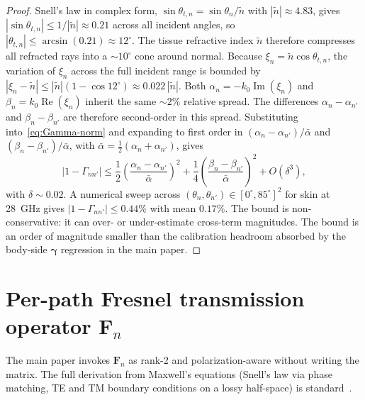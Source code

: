 \documentclass[10pt,journal,twocolumn]{IEEEtran}
\newcommand{\Fn}{\mathbf{F}_n}
\newcommand{\gammab}{\bm{\gamma}}
\newcommand{\ntilde}{\tilde{n}}
\DeclareMathOperator{\RE}{Re}
\DeclareMathOperator{\IM}{Im}
\theoremstyle{plain}
\theoremstyle{definition}
\begin{document}
\begin{proof}
Snell's law in complex form, $\sin\theta_{t,n} = \sin\theta_n/\ntilde$
with $|\ntilde| \approx 4.83$, gives
$|\sin\theta_{t,n}| \leq 1/|\ntilde| \approx 0.21$ across all
incident angles, so $|\theta_{t,n}| \leq \arcsin(0.21) \approx
12^{\circ}$. The tissue refractive index $\ntilde$ therefore
compresses all refracted rays into a $\sim\!10^{\circ}$ cone around
normal. Because $\xi_n = \ntilde \cos\theta_{t,n}$, the variation
of $\xi_n$ across the full incident range is bounded by
$|\xi_n - \ntilde| \leq |\ntilde|(1 - \cos 12^{\circ}) \approx
0.022\,|\ntilde|$. Both $\alpha_n = -k_0 \IM(\xi_n)$ and
$\beta_n = k_0 \RE(\xi_n)$ inherit the same $\sim\!2\%$ relative
spread. The differences $\alpha_n - \alpha_{n'}$ and
$\beta_n - \beta_{n'}$ are therefore second-order in this spread.
Substituting into~\eqref{eq:Gamma-norm} and expanding to first
order in $(\alpha_n - \alpha_{n'})/\bar\alpha$ and
$(\beta_n - \beta_{n'})/\bar\alpha$, with
$\bar\alpha = \tfrac{1}{2}(\alpha_n + \alpha_{n'})$, gives
\begin{equation}
  |1 - \Gamma_{nn'}|
    \leq \frac{1}{2}
    \left(\frac{\alpha_n - \alpha_{n'}}{\bar\alpha}\right)^2
    + \frac{1}{4}
    \left(\frac{\beta_n - \beta_{n'}}{\bar\alpha}\right)^2
    + O(\delta^3),
\end{equation}
with $\delta \sim 0.02$. A numerical sweep across
$(\theta_n, \theta_{n'}) \in [0^{\circ}, 85^{\circ}]^2$ for skin at
28~GHz gives $|1 - \Gamma_{nn'}| \leq 0.44\%$ with mean $0.17\%$.
The bound is non-conservative: it can over- or under-estimate
cross-term magnitudes. The bound is an order of magnitude smaller
than the calibration headroom absorbed by the body-side $\gammab$
regression in the main paper.
\end{proof}

\section{Per-path Fresnel transmission operator \texorpdfstring{$\mathbf{F}_n$}{Fn}}\label{si:Fn}

The main paper invokes $\Fn$ as rank-2 and polarization-aware
without writing the matrix. The full derivation from Maxwell's
equations (Snell's law via phase matching, TE and TM boundary
conditions on a lossy half-space) is standard~\cite{BornWolf}.
\end{document}
